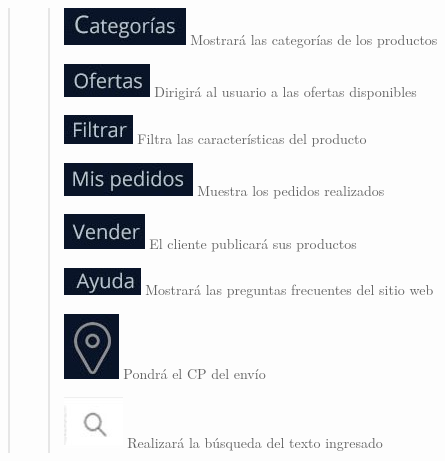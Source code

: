 \documentclass[14pt]{article}
\begin{document}
\begin{quote}
\begin{quote}
                            \includegraphics[height=0.02\textwidth]{BotonCategorias.jpg}
                            \label{P3:BotonCategorias} Mostrará las categorías de los productos
                           
                            \includegraphics[height=0.02\textwidth]{BotonOfertas.jpg}
                            \label{P3:BotonOfertas} Dirigirá al usuario a las ofertas disponibles
                            
                            \includegraphics[height=0.02\textwidth]{BotonFiltrar.jpg}
                            \label{P3:BotonFiltrar} Filtra las características del producto
                            
                            \includegraphics[height=0.02\textwidth]{BotonMisPedidos.jpg}
                            \label{P3:BotonMisPedidos} Muestra los pedidos realizados
                           
                            \includegraphics[height=0.02\textwidth]{BotonVender.jpg}
                            \label{P3:BotonVender} El cliente publicará sus productos
                            
                            \includegraphics[height=0.02\textwidth]{BotonAyuda.jpg}
                            \label{P3:BotonAyuda} Mostrará las preguntas frecuentes del sitio web
                            
                            \includegraphics[height=0.02\textwidth]{BotonUbicacion.jpg}
                            \label{P3:BotonUbicacion} Pondrá el CP del envío
                            
                            \includegraphics[height=0.02\textwidth]{BotonBuscar.jpg}
                            \label{P3:BotonBuscar} Realizará la búsqueda del texto ingresado
                            

\end{quote}
\end{quote}
\end{document}
